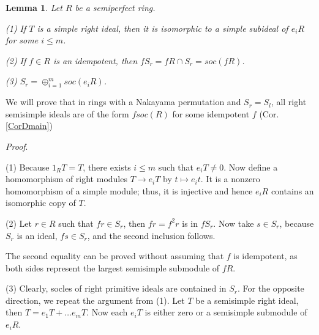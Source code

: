 \documentclass[11pt]{article}
\theoremstyle{plain}
\newtheorem{Lemma}[veta]{Lemma}
\theoremstyle{remark}
\theoremstyle{plain}
\newenvironment{Proof}{
  \par\medskip\noindent
  \textit{Proof}.
}{
\newline
\rightline{$\qedsymbol$}
}
\begin{document}
\begin{Lemma}\label{LemmaSoceR}
    Let $R$ be a semiperfect ring. 

    (1) If $T$ is a simple right ideal, then it is isomorphic to a simple subideal of $e_iR$ for some $i\leq m$.

    (2) If $f\in R$ is an idempotent, then  $fS_r=fR\cap S_r=soc(fR)$.

    (3) $S_r=\oplus^m_{i=1} soc(e_iR)$.
\end{Lemma}
We will prove that in rings with a Nakayama permutation and $S_r=S_l$, all right semisimple ideals are of the form $fsoc(R)$ for some idempotent $f$ (Cor. \ref{CorDmain})
\begin{Proof}
(1) Because $1_RT=T$, there exists $i\leq m$ such that $e_iT\neq 0$. Now define a homomorphism of right modules $T\to e_iT$ by $t\mapsto e_it$. It is a nonzero homomorphism of a simple module; thus, it is injective and hence $e_iR$ contains an isomorphic copy of $T$.     

(2) Let $r\in R$ such that $fr\in S_r$, then $fr=f^2r$ is in $fS_r$. Now take $s\in S_r$, because $S_r$ is an ideal, $fs\in S_r$, and the second inclusion follows.

    The second equality can be proved without assuming that $f$ is idempotent, as both sides represent the largest semisimple submodule of $fR$.

(3) Clearly, socles of right primitive ideals are contained in $S_r$. For the opposite direction, we repeat the argument from (1). Let $T$ be a semisimple right ideal, then $T=e_1T+\dots e_mT$. Now each $e_iT$ is either zero or a semisimple submodule of $e_iR$.  
\end{Proof}
\end{document}
